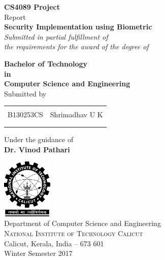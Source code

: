 \begin{titlepage}

\begin{center}

\textup{\small {\bf CS4089 Project} \\ Report}\\[0.2in]

\Large \textbf {Security Implementation using Biometric}\\[0.5in]

       \small \emph{Submitted in partial fulfillment of\\
        the requirements for the award of the degree of}
        \vspace{.2in}

       {\bf Bachelor of Technology \\in\\ Computer Science and Engineering}\\[0.5in]

\normalsize Submitted by \\
\begin{table}[h]
\centering
\begin{tabular}{lr}\hline \\
B130253CS & Shrimadhav U K \\ \\ \hline
\\
\end{tabular}
\end{table}

\vspace{.1in}
Under the guidance of\\
{\textbf{Dr. Vinod Pathari}}\\[0.2in]

\vfill

\includegraphics[width=0.18\textwidth]{./nitc-logo}\\[0.1in]
\Large{Department of Computer Science and Engineering}\\
\normalsize
\textsc{National Institute of Technology Calicut}\\
Calicut, Kerala, India -- 673 601 \\
\vspace{0.2cm}
Winter Semester 2017

\end{center}

\end{titlepage}

